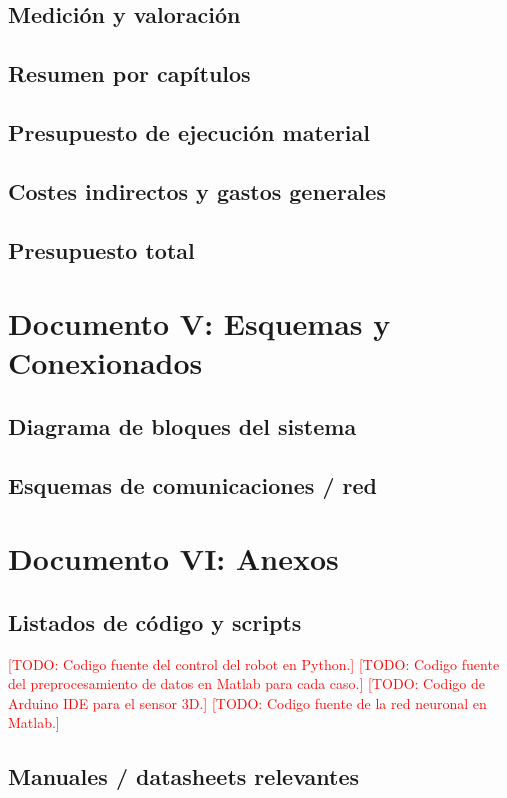 \documentclass[12pt,a4paper,oneside]{report}
\newcommand{\todo}[1]{\textcolor{red}{[TODO: #1]}}
\begin{document}
\section{Medición y valoración}
\section{Resumen por capítulos}
\section{Presupuesto de ejecución material}
\section{Costes indirectos y gastos generales}
\section{Presupuesto total}




\clearpage

\chapter{Documento V: Esquemas y Conexionados}
\section{Diagrama de bloques del sistema}
\section{Esquemas de comunicaciones / red}

\clearpage
\chapter{Documento VI: Anexos}



\section{Listados de código y scripts}
\todo{Codigo fuente del control del robot en Python.}
\todo{Codigo fuente del preprocesamiento de datos en Matlab para cada caso.}
\todo{Codigo de Arduino IDE para el sensor 3D.}
\todo{Codigo fuente de la red neuronal en Matlab.}
\section{Manuales / datasheets relevantes}
\end{document}
